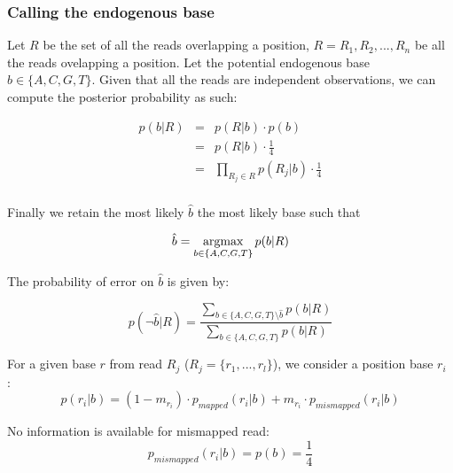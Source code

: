 \documentclass[a4paper,12pt]{article}
\newcommand{\argmax}{\operatornamewithlimits{argmax}}
\begin{document}
\subsubsection{Calling the endogenous base}

\noindent Let $R$ be the set of all the reads overlapping a position, $R={R_1,R_2,...,R_n}$ be all the reads ovelapping a position.  Let the potential endogenous base $b\in\{A,C,G,T\}$. Given that all the reads are independent observations, we can compute the posterior probability as such:

\begin{eqnarray}
  p(b|R)   & = & p(R|b) \cdot p(b)  \\
           & = & p(R|b) \cdot \frac {1} {4} \\
           & = & \prod_{R_j \in R} p(R_j|b) \cdot \frac {1} {4} \\
\end{eqnarray} 



\noindent  Finally we retain the most likely $\hat{b}$ the most likely base such that 

\begin{equation}
\hat{b} = \argmax_{b \in \{A,C,G,T\} }   p(b|R)
\end{equation} 


\noindent  The probability of error on $\hat{b}$ is given by:

\begin{equation}
p(\neg \hat{b}|R) = \frac { \sum\limits_{ b \in \{A,C,G,T\}  \setminus \hat{b} } p(b|R) } { \sum\limits_{ b \in \{A,C,G,T\}  } p(b|R) }
\label{errormt}
\end{equation}
 

\noindent For a given base $r$ from read $R_j$  ($R_j = \{ r_1, ..., r_l \}$), we consider a position base $r_{i}$ :
\begin{equation}
  p(r_i|b)   =  (1-m_{r_i}) \cdot p_{mapped}(r_i|b) + m_{r_i} \cdot p_{mismapped}(r_i|b) 
\end{equation} 


\noindent No information is available for mismapped read:
\begin{equation}
  p_{mismapped}(r_i|b)   =  p(b) =     \frac{ 1} {4} 
\end{equation} 
\end{document}
